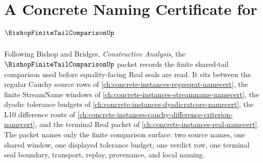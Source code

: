 \chapter{A Concrete Naming Certificate for $\BishopFiniteTailComparisonUp$}
\label{ch:concrete-instances-bishop-finite-tail-comparison-namecert}

Following Bishop and Bridges, \emph{Constructive Analysis}, the $\BishopFiniteTailComparisonUp$ packet records the finite shared-tail comparison used before equality-facing Real seals are read. It sits between the regular Cauchy source rows of \autoref{ch:concrete-instances-regseqrat-namecert}, the finite StreamName windows of \autoref{ch:concrete-instances-streamname-namecert}, the dyadic tolerance budgets of \autoref{ch:concrete-instances-dyadicratcore-namecert}, the L10 difference route of \autoref{ch:concrete-instances-cauchy-difference-criterion-namecert}, and the terminal Real packet of \autoref{ch:concrete-instances-real-namecert}. The packet names only the finite comparison surface: two source names, one shared window, one displayed tolerance budget, one verdict row, one terminal seal boundary, transport, replay, provenance, and local naming.

